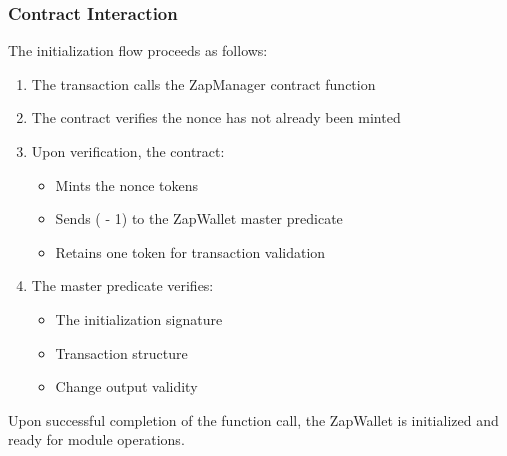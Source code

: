 \subsubsection{Contract Interaction}
The initialization flow proceeds as follows:
\begin{enumerate}
    \item The transaction calls the ZapManager contract  function
    \item The contract verifies the nonce has not already been minted
    \item Upon verification, the contract:
        \begin{itemize}
            \item Mints the nonce tokens
            \item Sends ( - 1) to the ZapWallet master predicate
            \item Retains one token for transaction validation
        \end{itemize}
    \item The master predicate verifies:
        \begin{itemize}
            \item The initialization signature
            \item Transaction structure
            \item Change output validity
        \end{itemize}
\end{enumerate}

Upon successful completion of the  function call, the ZapWallet is initialized and ready for module operations.